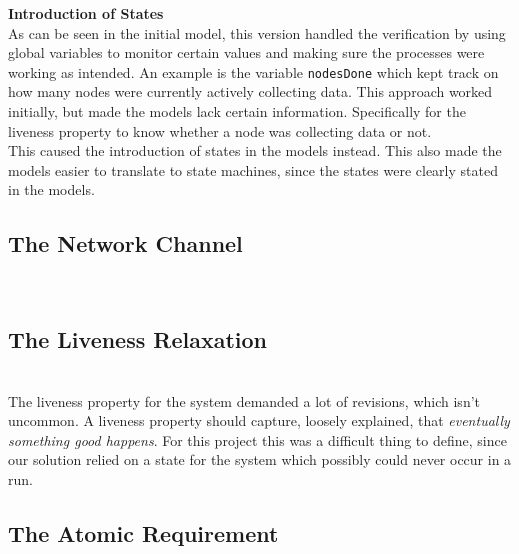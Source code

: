 \textbf{Introduction of States} \\


As can be seen in the initial model, this version handled the verification by using global variables to monitor certain values and making sure the processes were working as intended. An example is the variable \texttt{nodesDone} which kept track on how many nodes were currently actively collecting data. This approach worked initially, but made the models lack certain information. Specifically for the liveness property to know whether a node was collecting data or not. \\ 

This caused the introduction of states in the models instead. This also made the models easier to translate to state machines, since the states were clearly stated in the models.

\subsection{The Network Channel} \\




\subsection{The Liveness Relaxation} \\


The liveness property for the system demanded a lot of revisions, which isn't uncommon. A liveness property should capture, loosely explained, that \textit{eventually something good happens}. For this project this was a difficult thing to define, since our solution relied on a state for the system which possibly could never occur in a run. 



\subsection{The Atomic Requirement} \\

